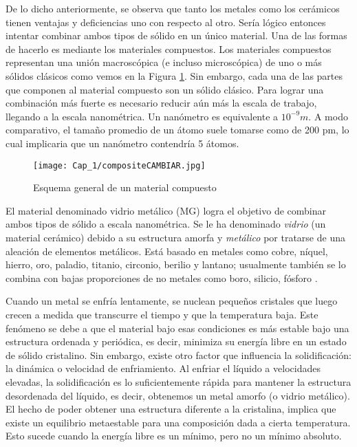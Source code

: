 De lo dicho anteriormente, se observa que tanto los metales como los cerámicos tienen ventajas y deficiencias uno con respecto al otro. Sería lógico entonces intentar combinar ambos tipos de sólido en un único material. Una de las formas de hacerlo es mediante los materiales compuestos. Los materiales compuestos representan una unión macroscópica (e incluso microscópica) de uno o más sólidos clásicos como vemos en la Figura \ref{C1:fg:composite}. Sin embargo, cada una de las partes que componen al material compuesto son un sólido clásico. Para lograr una combinación más fuerte es necesario reducir aún más la escala de trabajo, llegando a la escala nanométrica. Un nanómetro es equivalente a $10^{-9} m$. A modo comparativo, el tamaño promedio de un átomo suele tomarse como de 200 pm, lo cual implicaria que un nanómetro contendría 5 átomos.

\begin{figure}[h!]
 \centering
 \texttt{[image: Cap\_1/compositeCAMBIAR.jpg]}
 \caption[Material compuesto]{Esquema general de un material compuesto}
 \label{C1:fg:composite}
\end{figure}

El material denominado vidrio metálico (MG) logra el objetivo de combinar ambos tipos de sólido a escala nanométrica. Se le ha denominado \textit{vidrio} (un material cerámico) debido a su estructura amorfa y \textit{metálico} por tratarse de una aleación de elementos metálicos. Está basado en metales como cobre, níquel, hierro, oro, paladio, titanio, circonio, berilio y lantano; usualmente también se lo combina con bajas proporciones de no metales como boro, silicio, fósforo \cite{andrievski13}.

Cuando un metal se enfría lentamente, se nuclean pequeños cristales que luego crecen a medida que transcurre el tiempo y que la temperatura baja. Este fenómeno se debe a que el material bajo esas condiciones es más estable bajo una estructura ordenada y periódica, es decir, minimiza su energía libre en un estado de sólido cristalino. Sin embargo, existe otro factor que influencia la solidificación: la dinámica o velocidad de enfriamiento. Al enfriar el líquido a velocidades elevadas, la solidificación es lo suficientemente rápida para mantener la estructura desordenada del líquido, es decir, obtenemos un metal amorfo (o vidrio metálico). El hecho de poder obtener una estructura diferente a la cristalina, implica que existe un equilibrio metaestable para una composición dada a cierta temperatura. Esto sucede cuando la energía libre es un mínimo, pero no un mínimo absoluto.

